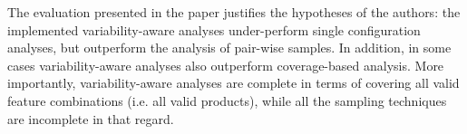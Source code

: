 \documentclass[11pt]{article}
\begin{document}
The evaluation presented in the paper justifies the hypotheses of the authors: the implemented variability-aware analyses under-perform single configuration analyses, but outperform the analysis of pair-wise samples. In addition, in some cases variability-aware analyses also outperform coverage-based analysis. More importantly, variability-aware analyses are complete in terms of covering all valid feature combinations (i.e. all valid products), while all the sampling techniques are incomplete in that regard.


 
\end{document}
